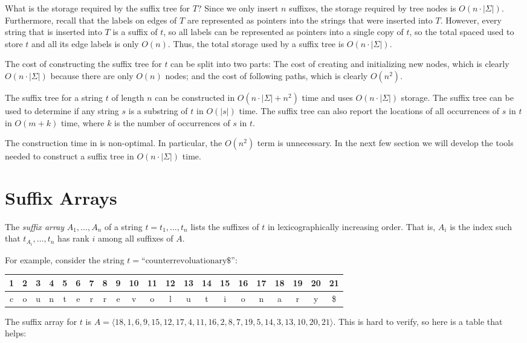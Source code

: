 What is the storage required by the suffix tree for $T$?  Since we
only insert $n$ suffixes, the storage required by tree nodes is
$O(n\cdot|\Sigma|)$.  Furthermore, recall that the labels on edges of $T$
are represented as pointers into the strings that were inserted into $T$.
However, every string that is inserted into $T$ is a suffix of $t$, so
all labels can be represented as pointers into a single copy of $t$, so
the total spaced used to store $t$ and all its edge labels is only $O(n)$.
Thus, the total storage used by a suffix tree is $O(n\cdot|\Sigma|)$.

The cost of constructing the suffix tree for $t$ can be split into two
parts:  The cost of creating and initializing new nodes, which is clearly
$O(n\cdot|\Sigma|)$ because there are only $O(n)$ nodes; and the cost
of following paths, which is clearly $O(n^2)$.

\begin{thm}
The suffix tree for a string $t$ of length $n$ can be constructed
in $O(n\cdot|\Sigma|+n^2)$ time and uses $O(n\cdot|\Sigma|)$ storage.
The suffix tree can be used to determine if any string $s$ is a substring
of $t$ in $O(|s|)$ time.  The suffix tree can also report the locations
of all occurrences of $s$ in $t$ in $O(m+k)$ time, where $k$ is the
number of occurrences of $s$ in $t$.
\end{thm}

The construction time in  is non-optimal.
In particular, the $O(n^2)$ term is unnecessary. In the next few section
we will develop the tools needed to construct a suffix tree in
$O(n\cdot|\Sigma|)$ time.


\section{Suffix Arrays}

The \emph{suffix array} $A_1,\ldots,A_n$ of a string $t=t_1,\ldots,t_n$ lists
the suffixes of $t$ in lexicographically increasing order.  That is,
$A_i$ is the index such that $t_{A_{i}},\ldots,t_n$ has rank $i$ among
all suffixes of $A$.

For example, consider the string $t=\text{``counterrevoluationary\$}$'':
\begin{center}
  \begin{tabular}{|c|c|c|c|c|c|c|c|c|c|c|c|c|c|c|c|c|c|c|c|c|}\hline
     1&2&3&4&5&6&7&8&9&10&11&12&13&14&15&16&17&18&19&20&21\\\hline
     c&o&u&n&t&e&r&r&e&v&o&l&u&t&i&o&n&a&r&y&\$\\\hline
  \end{tabular}
\end{center}
The suffix array for $t$ is
$A=\langle18,1,6,9,15,12,17,4,11,16,2,8,7,19,5,14,3,13,10,20,21\rangle$.  This is hard to verify, so here is a table that helps:

